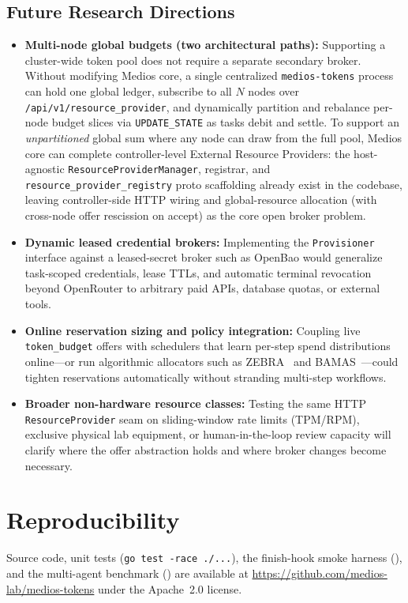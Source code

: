 \documentclass[11pt]{article}
\begin{document}
\subsection{Future Research Directions}
\begin{itemize}
  \item \textbf{Multi-node global budgets (two architectural paths):} Supporting a cluster-wide token pool does not require a separate secondary broker. Without modifying Medios core, a single centralized \texttt{medios-tokens} process can hold one global ledger, subscribe to all $N$ nodes over \texttt{/api/v1/resource\_provider}, and dynamically partition and rebalance per-node budget slices via \texttt{UPDATE\_STATE} as tasks debit and settle. To support an \emph{unpartitioned} global sum where any node can draw from the full pool, Medios core can complete controller-level External Resource Providers: the host-agnostic \texttt{ResourceProviderManager}, registrar, and \texttt{resource\_provider\_registry} proto scaffolding already exist in the codebase, leaving controller-side HTTP wiring and global-resource allocation (with cross-node offer rescission on accept) as the core open broker problem.
  \item \textbf{Dynamic leased credential brokers:} Implementing the \texttt{Provisioner} interface against a leased-secret broker such as OpenBao would generalize task-scoped credentials, lease TTLs, and automatic terminal revocation beyond OpenRouter to arbitrary paid APIs, database quotas, or external tools.
  \item \textbf{Online reservation sizing and policy integration:} Coupling live \texttt{token\_budget} offers with schedulers that learn per-step spend distributions online---or run algorithmic allocators such as ZEBRA~\cite{hamri2026zebra} and BAMAS~\cite{yang2025bamas}---could tighten reservations automatically without stranding multi-step workflows.
  \item \textbf{Broader non-hardware resource classes:} Testing the same HTTP \texttt{ResourceProvider} seam on sliding-window rate limits (TPM/RPM), exclusive physical lab equipment, or human-in-the-loop review capacity will clarify where the offer abstraction holds and where broker changes become necessary.
\end{itemize}

\section{Reproducibility}
Source code, unit tests (\texttt{go test -race ./...}), the finish-hook smoke harness (), and the multi-agent benchmark () are available at \url{https://github.com/medios-lab/medios-tokens} under the Apache~2.0 license.

{\small


}
\end{document}
